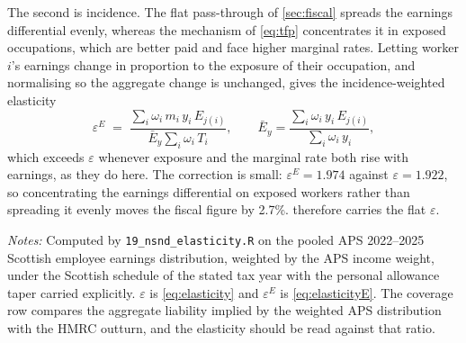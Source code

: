 The second is incidence. The flat pass-through of \cref{sec:fiscal} spreads the earnings differential evenly, whereas the mechanism of \cref{eq:tfp} concentrates it in exposed occupations, which are better paid and face higher marginal rates. Letting worker $i$'s earnings change in proportion to the exposure of their occupation, and normalising so the aggregate change is unchanged, gives the incidence-weighted elasticity
\begin{equation}\label{eq:elasticityE}
\varepsilon^{E} \;=\;
\frac{\sum_i \omega_i\, m_i\, y_i\, E_{j(i)}}
     {\bar{E}_y \sum_i \omega_i\, T_i},
\qquad
\bar{E}_y = \frac{\sum_i \omega_i\, y_i\, E_{j(i)}}{\sum_i \omega_i\, y_i},
\end{equation}
which exceeds $\varepsilon$ whenever exposure and the marginal rate both rise with earnings, as they do here. The correction is small: $\varepsilon^{E} = 1.974$ against $\varepsilon = 1.922$, so concentrating the earnings differential on exposed workers rather than spreading it evenly moves the fiscal figure by 2.7\%.  therefore carries the flat $\varepsilon$. 

\begin{table}[h]
\centering
\caption{Elasticity of Scottish NSND revenue to earnings}
\label{tab:elasticity}
\small

\begin{minipage}{0.92\textwidth}
\vspace{0.4em}\footnotesize
\textit{Notes:} Computed by \texttt{19\_nsnd\_elasticity.R} on the pooled APS
2022--2025 Scottish employee earnings distribution, weighted by the APS income weight, under the Scottish schedule of the stated tax year with the personal allowance taper carried explicitly. $\varepsilon$ is \cref{eq:elasticity} and $\varepsilon^{E}$ is \cref{eq:elasticityE}. The coverage row compares the aggregate liability implied by the weighted APS distribution with the HMRC outturn, and the elasticity should be read against that ratio.
\end{minipage}
\end{table}